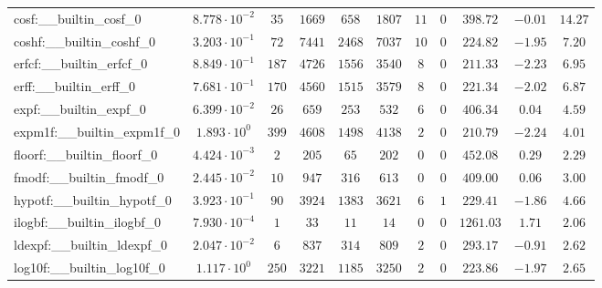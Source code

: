 \begin{tabular}{|l|c|c|c|c|c|c|c|c|c|c|}
cosf:\_\_builtin\_cosf\_0                 & $ 8.778 \cdot 10^{-2} $ & $ 35     $ & $ 1669   $ & $ 658   $ & $ 1807   $ & $ 11  $ & $ 0 $ & $ 398.72      $ & $ -0.01   $ & $ 14.27   $ \\
coshf:\_\_builtin\_coshf\_0               & $ 3.203 \cdot 10^{-1} $ & $ 72     $ & $ 7441   $ & $ 2468  $ & $ 7037   $ & $ 10  $ & $ 0 $ & $ 224.82      $ & $ -1.95   $ & $ 7.20    $ \\
erfcf:\_\_builtin\_erfcf\_0               & $ 8.849 \cdot 10^{-1} $ & $ 187    $ & $ 4726   $ & $ 1556  $ & $ 3540   $ & $ 8   $ & $ 0 $ & $ 211.33      $ & $ -2.23   $ & $ 6.95    $ \\
erff:\_\_builtin\_erff\_0                 & $ 7.681 \cdot 10^{-1} $ & $ 170    $ & $ 4560   $ & $ 1515  $ & $ 3579   $ & $ 8   $ & $ 0 $ & $ 221.34      $ & $ -2.02   $ & $ 6.87    $ \\
expf:\_\_builtin\_expf\_0                 & $ 6.399 \cdot 10^{-2} $ & $ 26     $ & $ 659    $ & $ 253   $ & $ 532    $ & $ 6   $ & $ 0 $ & $ 406.34      $ & $ 0.04    $ & $ 4.59    $ \\
expm1f:\_\_builtin\_expm1f\_0             & $ 1.893 \cdot 10^{0}  $ & $ 399    $ & $ 4608   $ & $ 1498  $ & $ 4138   $ & $ 2   $ & $ 0 $ & $ 210.79      $ & $ -2.24   $ & $ 4.01    $ \\
floorf:\_\_builtin\_floorf\_0             & $ 4.424 \cdot 10^{-3} $ & $ 2      $ & $ 205    $ & $ 65    $ & $ 202    $ & $ 0   $ & $ 0 $ & $ 452.08      $ & $ 0.29    $ & $ 2.29    $ \\
fmodf:\_\_builtin\_fmodf\_0               & $ 2.445 \cdot 10^{-2} $ & $ 10     $ & $ 947    $ & $ 316   $ & $ 613    $ & $ 0   $ & $ 0 $ & $ 409.00      $ & $ 0.06    $ & $ 3.00    $ \\
hypotf:\_\_builtin\_hypotf\_0             & $ 3.923 \cdot 10^{-1} $ & $ 90     $ & $ 3924   $ & $ 1383  $ & $ 3621   $ & $ 6   $ & $ 1 $ & $ 229.41      $ & $ -1.86   $ & $ 4.66    $ \\
ilogbf:\_\_builtin\_ilogbf\_0             & $ 7.930 \cdot 10^{-4} $ & $ 1      $ & $ 33     $ & $ 11    $ & $ 14     $ & $ 0   $ & $ 0 $ & $ 1261.03     $ & $ 1.71    $ & $ 2.06    $ \\
ldexpf:\_\_builtin\_ldexpf\_0             & $ 2.047 \cdot 10^{-2} $ & $ 6      $ & $ 837    $ & $ 314   $ & $ 809    $ & $ 2   $ & $ 0 $ & $ 293.17      $ & $ -0.91   $ & $ 2.62    $ \\
log10f:\_\_builtin\_log10f\_0             & $ 1.117 \cdot 10^{0}  $ & $ 250    $ & $ 3221   $ & $ 1185  $ & $ 3250   $ & $ 2   $ & $ 0 $ & $ 223.86      $ & $ -1.97   $ & $ 2.65    $ \\

\end{tabular}
